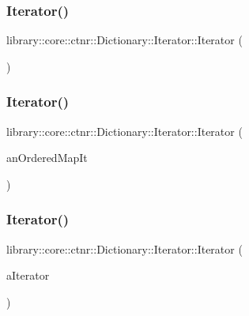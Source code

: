 \subsubsection{\texorpdfstring{Iterator()}{Iterator()}\hspace{0.1cm}{\footnotesize\ttfamily [1/3]}}
{\footnotesize\ttfamily library\+::core\+::ctnr\+::\+Dictionary\+::\+Iterator\+::\+Iterator (\begin{DoxyParamCaption}{ }\end{DoxyParamCaption})}

\mbox{\label{classlibrary_1_1core_1_1ctnr_1_1_dictionary_1_1_iterator_aa490a8fff909725ad18d1cb4f836fa3f}} 
\subsubsection{\texorpdfstring{Iterator()}{Iterator()}\hspace{0.1cm}{\footnotesize\ttfamily [2/3]}}
{\footnotesize\ttfamily library\+::core\+::ctnr\+::\+Dictionary\+::\+Iterator\+::\+Iterator (\begin{DoxyParamCaption}\item[{const \mbox{\hyperlink{classlibrary_1_1core_1_1ctnr_1_1_dictionary_1_1_iterator_a990205e908ac1bafcd754993219b805e}{Iterator\+::\+Map\+Iterator}} \&}]{an\+Ordered\+Map\+It }\end{DoxyParamCaption})}

\mbox{\label{classlibrary_1_1core_1_1ctnr_1_1_dictionary_1_1_iterator_af67d8a90f351b6edd60c4e08b1210d0f}} 
\subsubsection{\texorpdfstring{Iterator()}{Iterator()}\hspace{0.1cm}{\footnotesize\ttfamily [3/3]}}
{\footnotesize\ttfamily library\+::core\+::ctnr\+::\+Dictionary\+::\+Iterator\+::\+Iterator (\begin{DoxyParamCaption}\item[{const \mbox{\hyperlink{classlibrary_1_1core_1_1ctnr_1_1_dictionary_1_1_iterator}{Iterator}} \&}]{a\+Iterator }\end{DoxyParamCaption})}



